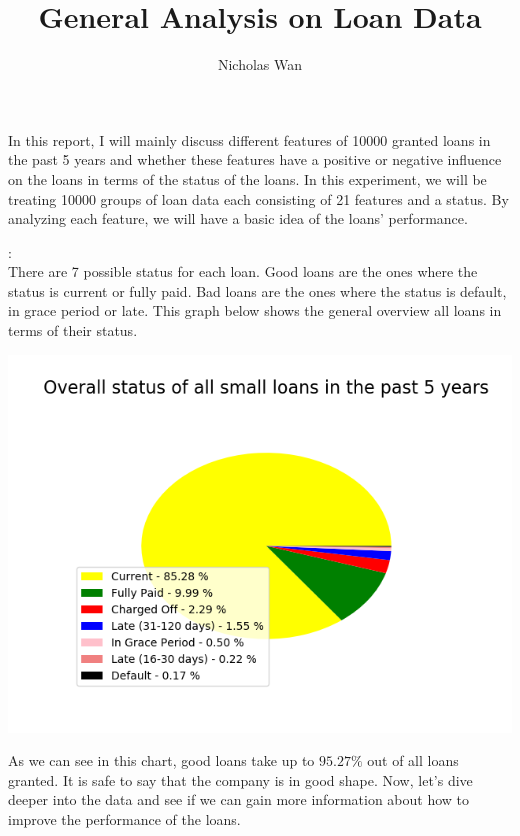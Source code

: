 \documentclass[10pt]{article}
\newenvironment{sect}[2][Section]{\begin{trivlist}
\item[\hskip \labelsep {\bfseries #2}]}{\end{trivlist}}
\begin{document}
    
\title{General Analysis on Loan Data}
\author{Nicholas Wan}
\maketitle

In this report, I will mainly discuss different features of 10000 granted loans in the past 5 years and whether these features have a positive or negative influence on the loans in terms of the status of the loans. In this experiment, we will be treating 10000 groups of loan data each consisting of 21 features and a status. By analyzing each feature, we will have a basic idea of the loans' performance.

\begin{sect}{Status Overview}
:\\
There are 7 possible status for each loan. Good loans are the ones where the status is current or fully paid. Bad loans are the ones where the status is default, in grace period or late. This graph below shows the general overview all loans in terms of their status.
\begin{center}
\includegraphics[scale=0.7]{overall_status_pie.png}
\end{center}
As we can see in this chart, good loans take up to $95.27\%$ out of all loans granted. It is safe to say that the company is in good shape. Now, let's dive deeper into the data and see if we can gain more information about how to improve the performance of the loans.
\end{sect}
\end{document}
